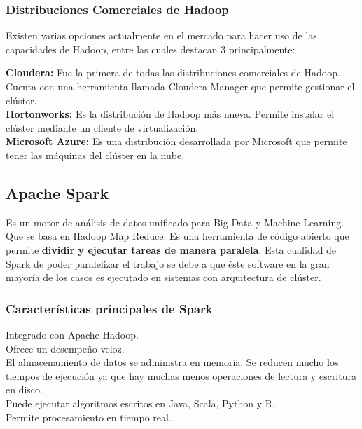 \subsubsection{Distribuciones Comerciales de Hadoop}
Existen varias opciones actualmente en el mercado para hacer uso de las capacidades de Hadoop, entre las cuales destacan 3 principalmente:\\

\begin{UClist}
	\UCli \textbf{Cloudera:} Fue la primera de todas las distribuciones comerciales de Hadoop. Cuenta con una herramienta llamada Cloudera Manager que permite gestionar el clúster.\\
	\UCli \textbf{Hortonworks:} Es la distribución de Hadoop más nueva. Permite instalar el clúster mediante un cliente de virtualización.\\
	\UCli \textbf{Microsoft Azure:} Es una distribución desarrollada por Microsoft que permite tener las máquinas del clúster en la nube.\\
\end{UClist}

\subsection{Apache Spark}
Es un motor de análisis de datos unificado para Big Data y Machine Learning. Que se basa en Hadoop Map Reduce. Es una herramienta de código abierto que permite \textbf{dividir y ejecutar tareas de manera paralela}. Esta cualidad de Spark de poder paralelizar el trabajo se debe a que éste software en la gran mayoría de los casos es ejecutado en sistemas con arquitectura de clúster. \\

\subsubsection{Características principales de Spark}
\begin{UClist}
	\UCli Integrado con Apache Hadoop.\\
	\UCli Ofrece un desempeño veloz.\\
	\UCli El almacenamiento de datos se administra en memoria. Se reducen mucho los tiempos de ejecución ya que hay muchas menos operaciones de lectura y escritura en disco.\\
	\UCli Puede ejecutar algoritmos escritos en Java, Scala, Python y R.\\
	\UCli Permite procesamiento en tiempo real.\\
\end{UClist}

